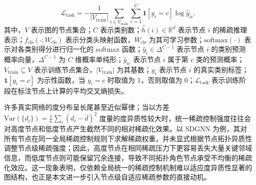 \begin{equation}
  \mathcal{L}_{\mathrm{task}} = -\frac{1}{|V_{\mathrm{train}}|} \sum_{i\in V_{\mathrm{train}}} \sum_{c=1}^C \mathbf{1}[y_i=c]\log\hat{y}_{ic}.
  \label{eq:ch3-taskloss}
\end{equation}
其中，$V$ 表示图的节点集合；$C$ 表示类别数；$\hat{h}(i)\in\mathbb{R}^{d}$ 表示节点 $i$ 的稀疏推理表示；$f_{\mathrm{cls}}(\cdot; W_{\mathrm{cls}})$ 表示分类头映射函数，$W_{\mathrm{cls}}$ 为其可学习参数；$\mathrm{softmax}(\cdot)$ 表示对各类别得分进行归一化的 softmax 函数；$\hat{y}_i\in\Delta^{C-1}$ 表示节点 $i$ 的类别预测概率向量，$\Delta^{C-1}$ 为 $C$ 维概率单纯形；$\hat{y}_{ic}$ 表示节点 $i$ 属于第 $c$ 类的预测概率；$V_{\mathrm{train}}\subseteq V$ 表示训练节点集合，$|V_{\mathrm{train}}|$ 为其基数；$y_i$ 表示节点 $i$ 的真实类别标签；$\mathbf{1}[y_i=c]$ 为示性函数，当 $y_i=c$ 时取值为 $1$，否则取值为 $0$；$\mathcal{L}_{\mathrm{task}}$ 表示训练阶段在标注节点上计算的平均交叉熵损失。

许多真实网络的度分布呈长尾甚至近似幂律；当以方差
$\mathrm{Var}(\{d_i\})=\frac{1}{n}\sum_i(d_i-\bar{d})^2$
度量的度异质性较大时，统一稀疏控制强度往往会对高度节点和低度节点产生截然不同的相对稀疏化效果。以 SDGNN 为例，其对所有节点在同一全局稀疏控制规则下求解稀疏权重，并未显式根据节点拓扑异质性调整节点级稀疏强度；因此，高度节点在相同稀疏压力下更容易丢失大量关键邻域信息，而低度节点则可能保留冗余连接，导致不同拓扑角色节点承受不均衡的稀疏化效应。这一现象表明，仅依赖全局统一的稀疏控制机制难以适应度异质性显著的图结构，也正是本文进一步引入节点级自适应稀疏参数的直接动机。

